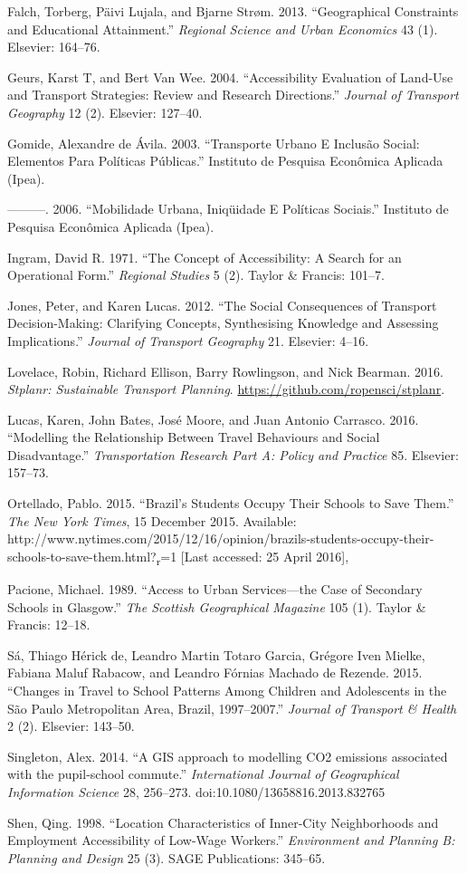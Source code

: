 \documentclass[3p,authoryear,preprint,review,12pt]{elsarticle}
\begin{document}
Falch, Torberg, P{ä}ivi Lujala, and Bjarne Str{ø}m. 2013. ``Geographical
Constraints and Educational Attainment.'' \emph{Regional Science and
Urban Economics} 43 (1). Elsevier: 164--76.

Geurs, Karst T, and Bert Van Wee. 2004. ``Accessibility Evaluation of
Land-Use and Transport Strategies: Review and Research Directions.''
\emph{Journal of Transport Geography} 12 (2). Elsevier: 127--40.

Gomide, Alexandre de {Á}vila. 2003. ``Transporte Urbano E Inclusão
Social: Elementos Para Políticas Públicas.'' Instituto de Pesquisa
Econômica Aplicada (Ipea).

---------. 2006. ``Mobilidade Urbana, Iniqüidade E Políticas Sociais.''
Instituto de Pesquisa Econômica Aplicada (Ipea).

Ingram, David R. 1971. ``The Concept of Accessibility: A Search for an
Operational Form.'' \emph{Regional Studies} 5 (2). Taylor \& Francis:
101--7.

Jones, Peter, and Karen Lucas. 2012. ``The Social Consequences of
Transport Decision-Making: Clarifying Concepts, Synthesising Knowledge
and Assessing Implications.'' \emph{Journal of Transport Geography} 21.
Elsevier: 4--16.

Lovelace, Robin, Richard Ellison, Barry Rowlingson, and Nick Bearman.
2016. \emph{Stplanr: Sustainable Transport Planning}.
\url{https://github.com/ropensci/stplanr}.

Lucas, Karen, John Bates, Jos{é} Moore, and Juan Antonio Carrasco. 2016.
``Modelling the Relationship Between Travel Behaviours and Social
Disadvantage.'' \emph{Transportation Research Part A: Policy and
Practice} 85. Elsevier: 157--73.

Ortellado, Pablo. 2015. ``Brazil's Students Occupy Their Schools to Save
Them.'' \emph{The New York Times}, 15 December 2015. Available:
http://www.nytimes.com/2015/12/16/opinion/brazils-students-occupy-their-schools-to-save-them.html?\textsubscript{r}=1
{[}Last accessed: 25 April 2016{]},

Pacione, Michael. 1989. ``Access to Urban Services---the Case of
Secondary Schools in Glasgow.'' \emph{The Scottish Geographical
Magazine} 105 (1). Taylor \& Francis: 12--18.

S{á}, Thiago H{é}rick de, Leandro Martin Totaro Garcia, Gr{é}gore Iven
Mielke, Fabiana Maluf Rabacow, and Leandro F{ó}rnias Machado de Rezende.
2015. ``Changes in Travel to School Patterns Among Children and
Adolescents in the São Paulo Metropolitan Area, Brazil, 1997--2007.''
\emph{Journal of Transport \& Health} 2 (2). Elsevier: 143--50.

Singleton, Alex. 2014. ``A GIS approach to modelling CO2 emissions associated with the pupil-school commute.'' \emph{International Journal of Geographical Information Science} 28, 256–273. doi:10.1080/13658816.2013.832765

Shen, Qing. 1998. ``Location Characteristics of Inner-City Neighborhoods
and Employment Accessibility of Low-Wage Workers.'' \emph{Environment
and Planning B: Planning and Design} 25 (3). SAGE Publications: 345--65.
\end{document}
